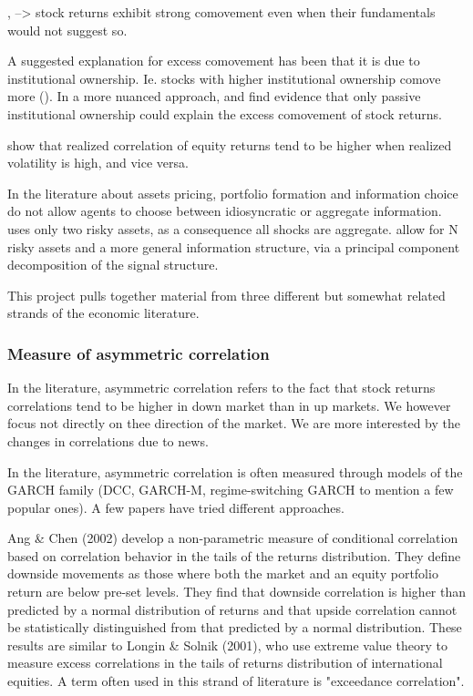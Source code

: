 \vspace{1cm}

\textcite{Barberis2005}, \textcite{Greenwood2008} --> stock returns exhibit strong comovement even when their fundamentals would not suggest so. 

\vspace{1cm}

A suggested explanation for excess comovement has been that it is due to institutional ownership. Ie. stocks with higher institutional ownership comove more (\cite{Pindyck1993}). In a more nuanced approach, \textcite{Kacperczyk2012} and \textcite{Kacperczyk2016} find evidence that only passive institutional ownership could explain the excess comovement of stock returns.

\vspace{1cm}

\textcite{Andersen2000} show that realized correlation of equity returns tend to be higher when realized volatility is high, and vice versa.

\vspace{1cm}

In the literature about assets pricing, portfolio formation and information choice \textcite{VanNieuwerburgh2010} do not allow agents to choose between idiosyncratic or aggregate information. \textcite{Mondria2010} uses only two risky assets, as a consequence all shocks are aggregate. \textcite{Kacperczyk2016} allow for N risky assets and a more general information structure, via a principal component decomposition of the signal structure.

This project pulls together material from three different but somewhat related strands of the economic literature.

\subsubsection{Measure of asymmetric correlation}
In the literature, asymmetric correlation refers to the fact that stock returns correlations tend to be higher in down market than in up markets. We however focus not directly on thee direction of the market. We are more interested by the changes in correlations due to news.


In the literature, asymmetric correlation is often measured through models of the GARCH family (DCC, GARCH-M, regime-switching GARCH to mention a few popular ones). A few papers have tried different approaches.

Ang \& Chen (2002) develop a non-parametric measure of conditional correlation based on correlation behavior in the tails of the returns distribution. They define downside movements as those where both the market and an equity portfolio return are below pre-set levels. They find that downside correlation is higher than predicted by a normal distribution of returns and that upside correlation cannot be statistically distinguished from that predicted by a normal distribution. These results are similar to Longin \& Solnik (2001), who use extreme value theory to measure excess correlations in the tails of returns distribution of international equities. A term often used in this strand of literature is "exceedance correlation".

